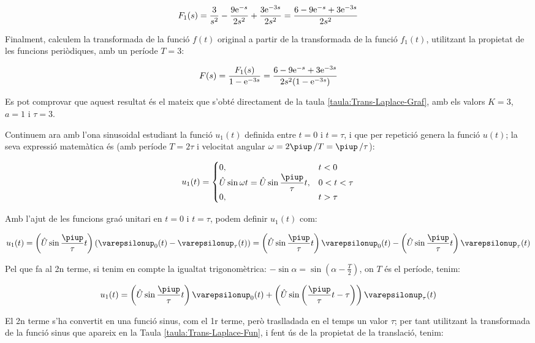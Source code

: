 \begin{exemple}
    \[
        F_1(s) = \frac{3}{s^2} - \frac{9 \mathrm{e}^{-s}}{2 s^2} + \frac{3 \mathrm{e}^{-3s}}{2
        s^2} =\frac{6-9\mathrm{e}^{-s}+3\mathrm{e}^{-3s}}{2s^2}
    \]

    Finalment, calculem la transformada de la funció $f(t)$ original a
    partir de la transformada de la funció $f_1(t)$, utilitzant la
    propietat de les funcions periòdiques, amb un període $T=3$:

    \[
        F(s) = \frac{F_1(s)}{1-\mathrm{e}^{-3s}} = \frac{6-9\mathrm{e}^{-s}+3\mathrm{e}^{-3s}}{2s^2(1-\mathrm{e}^{-3s}) }
    \]

    Es pot comprovar que aquest resultat és el mateix que s'obté directament de la taula \vref{taula:Trans-Laplace-Graf}, amb els valors $K=3$, $a=1$ i $\tau=3$.

    Continuem ara  amb l'ona sinusoidal estudiant la funció $u_1(t)$
    definida entre $t=0$ i $t=\tau$, i que per repetició genera la
    funció $u(t)$; la seva expressió matemàtica és (amb període $T=
    2\tau$ i velocitat angular $\omega= 2\piup\,/T  = \piup\,/\tau$):

    \[
        u_1(t) = \begin{cases} 0, & t < 0\\ \hat{U}\sin\omega t =
        \hat{U}\sin\dfrac{\piup}{\tau}t,  & 0<t<\tau \\ 0, & t > \tau \end{cases}
    \]


    Amb l'ajut de les funcions graó unitari en $t=0$ i $t=\tau$, podem
    definir $u_1(t)$ com:

    \[
        u_1(t)=\left(\hat{U}\sin\frac{\piup}{\tau}t\right)(\varepsilonup_0(t)-\varepsilonup_\tau(t))
        =\left(\hat{U}\sin\frac{\piup}{\tau}t\right)\varepsilonup_0(t) - \left(\hat{U}\sin\frac{\piup}{\tau}t\right)\varepsilonup_\tau(t)
    \]

    Pel que fa al 2n  terme, si tenim en compte la igualtat
    trigonomètrica: $-\sin \alpha = \sin(\alpha-\frac{T}{2})$, on $T$ és
    el període, tenim:

    \[
        u_1(t) = \left(\hat{U}\sin\frac{\piup}{\tau}t\right)\varepsilonup_0(t) +
        \left(\hat{U}\sin\left(\frac{\piup}{\tau}t-\tau\right)\right)\varepsilonup_\tau(t)
    \]

    El 2n terme s'ha convertit en una funció sinus, com el 1r terme,
    però traslladada en el temps un valor $\tau$; per tant utilitzant la
    transformada de la funció sinus que apareix en la Taula
    \vref{taula:Trans-Laplace-Fun}, i fent ús de la propietat de la
    translació, tenim:


\end{exemple}

